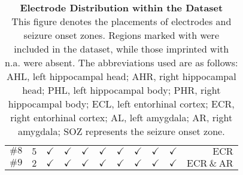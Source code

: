 \documentclass[preprint,review,12pt]{elsarticle}%
\begin{document}
\begin{table}[htbp]
\begin{tabular}{*{11}{r}}
\rowcolor{lightgray}
$\mathrm{\#8}$ & $\mathrm{5}$ & $\mathrm{\checkmark}$ & $\mathrm{\checkmark}$ & $\mathrm{\checkmark}$ & $\mathrm{\checkmark}$ & $\mathrm{\checkmark}$ & $\mathrm{\checkmark}$ & $\mathrm{\checkmark}$ & $\mathrm{\checkmark}$ & $\mathrm{ECR}$\\
$\mathrm{\#9}$ & $\mathrm{2}$ & $\mathrm{\checkmark}$ & $\mathrm{\checkmark}$ & $\mathrm{\checkmark}$ & $\mathrm{\checkmark}$ & $\mathrm{\checkmark}$ & $\mathrm{\checkmark}$ & $\mathrm{\checkmark}$ & $\mathrm{\checkmark}$ & $\mathrm{ECR\ \&\ AR}$\\
\bottomrule
\end{tabular}
\captionsetup{width=\textwidth}
\caption{\textbf{
Electrode Distribution within the Dataset
}
\smallskip
\\
This figure denotes the placements of electrodes and seizure onset zones. Regions marked with \checkmark were included in the dataset, while those imprinted with n.a. were absent. The abbreviations used are as follows: AHL, left hippocampal head; AHR, right hippocampal head; PHL, left hippocampal body; PHR, right hippocampal body; ECL, left entorhinal cortex; ECR, right entorhinal cortex; AL, left amygdala; AR, right amygdala; SOZ represents the seizure onset zone.
}
\end{table}

\restoregeometry
\end{document}

